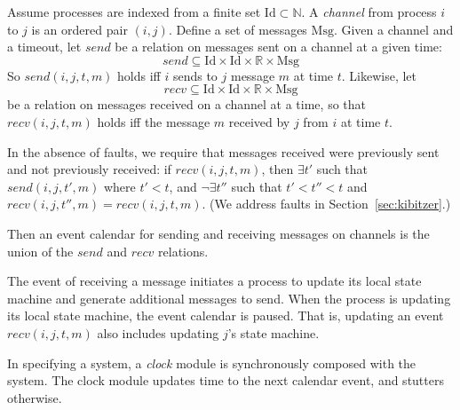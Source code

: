 \documentclass{llncs/llncs}
\newcommand{\Id}{\ensuremath{\mathrm{Id}}}
\newcommand{\Msg}{\ensuremath{\mathrm{Msg}}}
\newcommand{\lee}[1]{ } %
\newcommand{\lee}[1]{ {\color{blue}$<$lee: #1$>$} } %
\begin{document}
Assume processes are indexed from a finite set $\Id \subset \mathbb{N}$. A \emph{channel} from process $i$ to $j$ is an ordered pair $(i,j)$. Define a set of messages $\Msg$. Given a channel and a timeout, let $send$ be a relation on messages sent on a channel at a given time:
$$send \subseteq \Id \times \Id \times \mathbb{R} \times \Msg$$
So $send(i, j, t, m)$ holds iff $i$ sends to $j$ message $m$ at time $t$. Likewise, let
$$recv \subseteq \Id \times \Id \times \mathbb{R} \times \Msg$$
be a relation on messages received on a channel at a time, so that $recv(i, j, t, m)$ holds iff the message $m$ received by $j$ from $i$ at time $t$.

In the absence of faults, we require that messages received were previously sent and not previously received: if $recv(i, j, t, m)$, then $\exists t'$ such that $send(i, j, t', m)$ where $t' < t$, and $\neg\exists t''$ such that $t' < t'' < t$ and $recv(i, j, t'', m) = recv(i, j, t, m)$. (We address faults in Section~\ref{sec:kibitzer}.)

Then an event calendar for sending and receiving messages on channels is the union of the $send$ and $recv$ relations.

The event of receiving a message initiates a process to update its local state machine and generate additional messages to send. When the process is updating its local state machine, the event calendar is paused. That is, updating an event $recv(i, j, t, m)$ also includes updating $j$'s state machine.

In specifying a system, a \emph{clock} module is synchronously composed with the system. The clock module updates time to the next calendar event, and stutters otherwise.


\lee{Cutting synchronous observer section; need to talk about use for lemmas elsewhere.}

\end{document}
